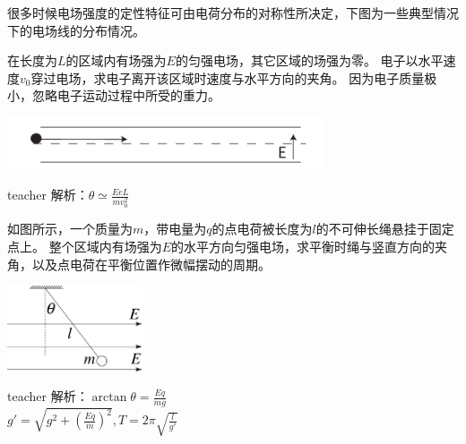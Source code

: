 很多时候电场强度的定性特征可由电荷分布的对称性所决定，下图为一些典型情况下的电场线的分布情况。


\begin{example}
在长度为$L$的区域内有场强为$E$的匀强电场，其它区域的场强为零。
电子以水平速度$v_0$穿过电场，求电子离开该区域时速度与水平方向的夹角。
因为电子质量极小，忽略电子运动过程中所受的重力。
\begin{flushright}
\includegraphics*[width=0.7\textwidth]{images/elec-problem-05.pdf}
\end{flushright}
\begin{taggedblock}{teacher}
\noindent
解析：$\theta\simeq\frac{EeL}{mv_0^2}$
\end{taggedblock}
\end{example}



\begin{example}
如图所示，一个质量为$m$，带电量为$q$的点电荷被长度为$l$的不可伸长绳悬挂于固定点上。
整个区域内有场强为$E$的水平方向匀强电场，求平衡时绳与竖直方向的夹角，以及点电荷在平衡位置作微幅摆动的周期。
\begin{flushright}
\includegraphics[width=0.3\textwidth]{images/elec-problem-2.pdf}
\end{flushright}
\begin{taggedblock}{teacher}
\noindent
解析：$\arctan\theta=\frac{Eq}{mg}$
\\$g'=\sqrt{g^2+(\frac{Eq}{m})^2},T=2\pi\sqrt{\frac{l}{g'}}$
\end{taggedblock}
\end{example}




